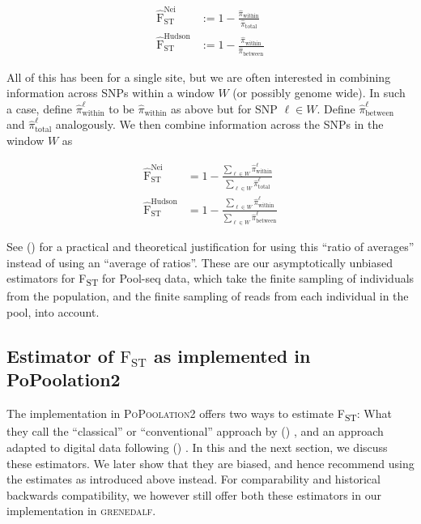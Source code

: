 \documentclass[a4paper,fontsize=9pt,DIV=14]{scrartcl}
\newcommand\citeay[1]{\citeauthor{#1} (\citeyear{#1}) \cite{#1}}
\newcommand\toolname{\textsc}
\newcommand{\fst}{F\textsubscript{ST}}
\begin{document}
\begin{align}
    \widehat{\text{F}}_\text{ST}^\text{Nei} &:= 1 - \frac{\widehat{\pi}_\text{within}}{\widehat{\pi}_\text{total}}\\
    \widehat{\text{F}}_\text{ST}^\text{Hudson} &:= 1 - \frac{\widehat{\pi}_\text{within}}{\widehat{\pi}_\text{between}}
\end{align}

All of this has been for a single site, but we are often interested in combining information across SNPs within a window $W$ (or possibly genome wide).
In such a case, define $\widehat{\pi}^\ell_\text{within}$ to be $\widehat{\pi}_\text{within}$ as above but for SNP $\ell \in W$.
Define $\widehat{\pi}^\ell_\text{between}$ and $\widehat{\pi}^\ell_\text{total}$ analogously.
We then combine information across the SNPs in the window $W$ as

\begin{align}
    \widehat{\text{F}}_\text{ST}^\text{Nei}    &= 1 - \frac{\sum_{\ell \in W} \widehat{\pi}^\ell_\text{within}} {\sum_{\ell \in W} \widehat{\pi}^\ell_\text{total}} \\
    \widehat{\text{F}}_\text{ST}^\text{Hudson} &= 1 - \frac{\sum_{\ell \in W} \widehat{\pi}^\ell_\text{within}} {\sum_{\ell \in W} \widehat{\pi}^\ell_\text{between}}
\end{align}

See \citeay{Bhatia2013} for a practical and theoretical justification for using this ``ratio of averages'' instead of using an ``average of ratios''.
These are our asymptotically unbiased estimators for \fst{} for Pool-seq data, which take the finite sampling of individuals from the population, and the finite sampling of reads from each individual in the pool, into account.


\subsection{Estimator of \texorpdfstring{$\text{F}_\text{ST}$}{FST} as implemented in PoPoolation2}
\label{supp:sec:FST:sub:PoPoolation2Estimator}

The implementation in \toolname{PoPoolation2} \cite{Kofler2011b} offers two ways to estimate \fst{}:
What they call the ``classical'' or ``conventional'' approach by \citeay{Hartl2007}, and an approach adapted to digital data following \citeay{Karlsson2007}.
In this and the next section, we discuss these estimators.
We later show that they are biased, and hence recommend using the estimates as introduced above instead.
For comparability and historical backwards compatibility, we however still offer both these estimators in our implementation in \toolname{grenedalf}.
\end{document}
